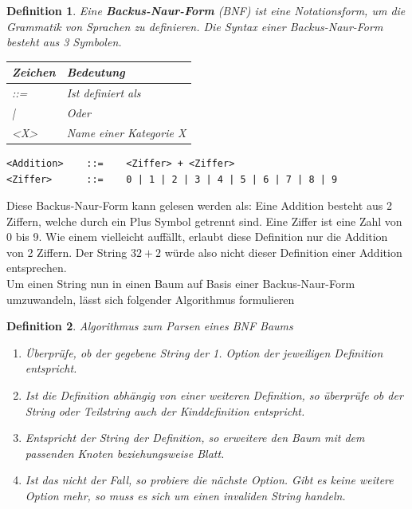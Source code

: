 \documentclass[11pt]{article}
\newtheorem{defin}{Definition}
\begin{document}
\begin{defin}
  Eine \textbf{Backus-Naur-Form} (BNF) ist  
  eine Notationsform, um die Grammatik von Sprachen zu definieren. 
  Die Syntax einer Backus-Naur-Form besteht aus 3 Symbolen.

  \begin{table}[h]
  \begin{tabular}{|l|l|}
  \hline
    Zeichen     & Bedeutung               \\ \hline \hline
    ::=         & Ist definiert als       \\ \hline
    |           & Oder                    \\ \hline
    <X>         & Name einer Kategorie X  \\ \hline
  \end{tabular}
  \end{table}
\end{defin}

\begin{verbatim}
<Addition>    ::=    <Ziffer> + <Ziffer>
<Ziffer>      ::=    0 | 1 | 2 | 3 | 4 | 5 | 6 | 7 | 8 | 9 
\end{verbatim}
Diese Backus-Naur-Form kann gelesen werden als: 
Eine Addition besteht aus 2 Ziffern, 
welche durch ein Plus Symbol getrennt sind. 
Eine Ziffer ist eine Zahl von 0 bis 9. 
Wie einem vielleicht auffällt, erlaubt diese Definition nur 
die Addition von 2 Ziffern. Der String $32+2$ würde also nicht 
dieser Definition einer Addition entsprechen. \newline \\
Um einen String nun in einen Baum auf Basis einer Backus-Naur-Form umzuwandeln, 
lässt sich folgender Algorithmus formulieren

\begin{defin}
  Algorithmus zum Parsen eines BNF Baums
  \begin{enumerate}
    \item Überprüfe, ob der gegebene String der 1. Option der jeweiligen Definition entspricht.
    \item Ist die Definition abhängig von einer weiteren Definition, so überprüfe ob der String oder Teilstring auch der Kinddefinition entspricht.
    \item Entspricht der String der Definition, so erweitere den Baum mit dem passenden Knoten beziehungsweise Blatt.
    \item Ist das nicht der Fall, so probiere die nächste Option. Gibt es keine weitere Option mehr, so muss es sich um einen invaliden String handeln.
  \end{enumerate}
\end{defin}
\end{document}
